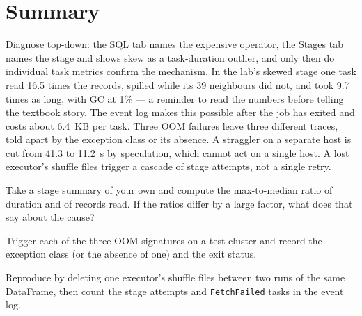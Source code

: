 \section{Summary}
\label{sec:debug-summary}

Diagnose top-down: the SQL tab names the expensive operator, the Stages tab names the
stage and shows skew as a task-duration outlier, and only then do individual task
metrics confirm the mechanism. In the lab's skewed stage one task read 16.5 times the
records, spilled while its 39 neighbours did not, and took 9.7 times as long, with GC
at 1\% --- a reminder to read the numbers before telling the textbook story. The event
log makes this possible after the job has exited and costs about 6.4~KB per task. Three
OOM failures leave three different traces, told apart by the exception class or its
absence. A straggler on a separate host is cut from 41.3 to 11.2~s by speculation,
which cannot act on a single host. A lost executor's shuffle files trigger a cascade
of stage attempts, not a single retry.

\exercisehead
\begin{exercises}
\item Take a stage summary of your own and compute the max-to-median ratio of
      duration and of records read. If the ratios differ by a large factor, what does
      that say about the cause?
\item Trigger each of the three OOM signatures on a test cluster and record the
      exception class (or the absence of one) and the exit status.
\item Reproduce  by deleting one executor's shuffle
      files between two runs of the same DataFrame, then count the stage attempts and
      \texttt{FetchFailed} tasks in the event log.
\end{exercises}
